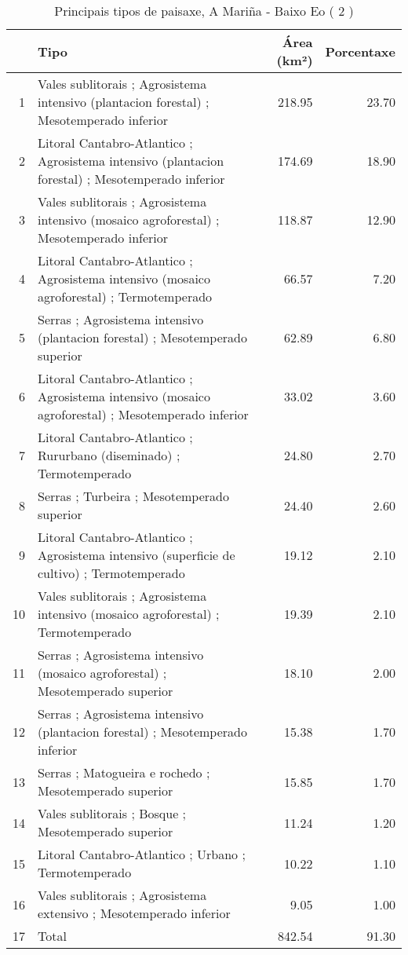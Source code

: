 \begin{table}[p]
\centering
\caption{Principais tipos de paisaxe,  A Mariña - Baixo Eo ( 2 )} 
\label{Tipos 2}
\begin{tabular}{rlrr}
  \hline
 & Tipo & Área (km²) & Porcentaxe \\ 
  \hline
1 & Vales sublitorais ; Agrosistema intensivo (plantacion forestal) ; Mesotemperado inferior & 218.95 & 23.70 \\ 
  2 & Litoral Cantabro-Atlantico ; Agrosistema intensivo (plantacion forestal) ; Mesotemperado inferior & 174.69 & 18.90 \\ 
  3 & Vales sublitorais ; Agrosistema intensivo (mosaico agroforestal) ; Mesotemperado inferior & 118.87 & 12.90 \\ 
  4 & Litoral Cantabro-Atlantico ; Agrosistema intensivo (mosaico agroforestal) ; Termotemperado & 66.57 & 7.20 \\ 
  5 & Serras ; Agrosistema intensivo (plantacion forestal) ; Mesotemperado superior & 62.89 & 6.80 \\ 
  6 & Litoral Cantabro-Atlantico ; Agrosistema intensivo (mosaico agroforestal) ; Mesotemperado inferior & 33.02 & 3.60 \\ 
  7 & Litoral Cantabro-Atlantico ; Rururbano (diseminado) ; Termotemperado & 24.80 & 2.70 \\ 
  8 & Serras ; Turbeira ; Mesotemperado superior & 24.40 & 2.60 \\ 
  9 & Litoral Cantabro-Atlantico ; Agrosistema intensivo (superficie de cultivo) ; Termotemperado & 19.12 & 2.10 \\ 
  10 & Vales sublitorais ; Agrosistema intensivo (mosaico agroforestal) ; Termotemperado & 19.39 & 2.10 \\ 
  11 & Serras ; Agrosistema intensivo (mosaico agroforestal) ; Mesotemperado superior & 18.10 & 2.00 \\ 
  12 & Serras ; Agrosistema intensivo (plantacion forestal) ; Mesotemperado inferior & 15.38 & 1.70 \\ 
  13 & Serras ; Matogueira e rochedo ; Mesotemperado superior & 15.85 & 1.70 \\ 
  14 & Vales sublitorais ; Bosque ; Mesotemperado superior & 11.24 & 1.20 \\ 
  15 & Litoral Cantabro-Atlantico ; Urbano ; Termotemperado & 10.22 & 1.10 \\ 
  16 & Vales sublitorais ; Agrosistema extensivo ; Mesotemperado inferior & 9.05 & 1.00 \\ 
  17 & Total & 842.54 & 91.30 \\ 
   \hline
\end{tabular}
\end{table}
